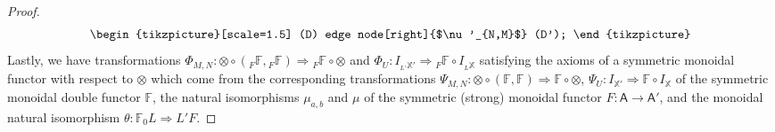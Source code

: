 \documentclass[oneside,final]{ucr}
\theoremstyle{definition}
\begin{document}
{\begin{proof}
\[\begin{tikzpicture}[scale=1.5]
(D) edge node[right]{$\nu'_{N,M}$} (D');
\end{tikzpicture}
\]
Lastly, we have transformations $\Phi_{M,N} \colon \otimes \circ ({ _F \mathbb{F} },{ _F \mathbb{F} }) \Rightarrow { _F \mathbb{F} } \circ \otimes$ and $\Phi_U \colon I_{ {_{L'}\mathbb{X}'} } \Rightarrow { _F \mathbb{F} } \circ I_{{ _L \mathbb{X}}}$ satisfying the axioms of a symmetric monoidal functor with respect to $\otimes$ which come from the corresponding transformations $\Psi_{M,N} \colon \otimes \circ (\mathbb{F},\mathbb{F}) \Rightarrow \mathbb{F} \circ \otimes$, $\Psi_U \colon I_{\mathbb{X}'} \Rightarrow \mathbb{F} \circ I_{\mathbb{X}}$ of the symmetric monoidal double functor $\mathbb{F}$, the natural isomorphisms $\mu_{a,b}$ and $\mu$ of the symmetric (strong) monoidal functor $F \colon \mathsf{A} \to \mathsf{A'}$, and the monoidal natural isomorphism $\theta \colon \mathbb{F}_0 L \Rightarrow L' F$.
\end{proof}

}
\end{document}

